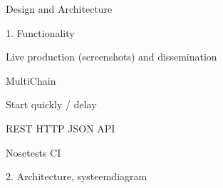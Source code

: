 Design and Architecture


1. Functionality

Live production (screenshots) and dissemination

MultiChain

Start quickly / delay

REST HTTP JSON API

Nosetests CI


2. Architecture, systeemdiagram


